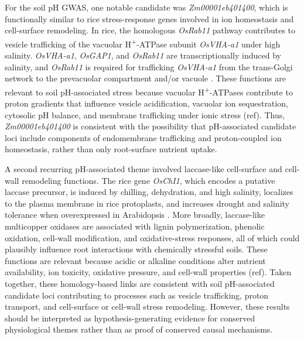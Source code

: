 \documentclass[unnumsec,webpdf,contemporary,large]{oup-authoring-template}%
\theoremstyle{thmstyleone}%
\theoremstyle{thmstyletwo}%
\theoremstyle{thmstylethree}%
\begin{document}
For the soil pH GWAS, one notable candidate was \textit{Zm00001eb401400}, which is functionally similar to rice stress-response genes involved in ion homeostasis and cell-surface remodeling. In rice, the homologous \textit{OsRab11} pathway contributes to vesicle trafficking of the vacuolar H\textsuperscript{+}-ATPase subunit \textit{OsVHA-a1} under high salinity. \textit{OsVHA-a1}, \textit{OsGAP1}, and \textit{OsRab11} are transcriptionally induced by salinity, and \textit{OsRab11} is required for trafficking \textit{OsVHA-a1} from the trans-Golgi network to the prevacuolar compartment and/or vacuole \citep{Son2013OsRab11}. These functions are relevant to soil pH-associated stress because vacuolar H\textsuperscript{+}-ATPases contribute to proton gradients that influence vesicle acidification, vacuolar ion sequestration, cytosolic pH balance, and membrane trafficking under ionic stress (ref). Thus, \textit{Zm00001eb401400} is consistent with the possibility that pH-associated candidate loci include components of endomembrane trafficking and proton-coupled ion homeostasis, rather than only root-surface nutrient uptake.

A second recurring pH-associated theme involved laccase-like cell-surface and cell-wall remodeling functions. The rice gene \textit{OsChI1}, which encodes a putative laccase precursor, is induced by chilling, dehydration, and high salinity, localizes to the plasma membrane in rice protoplasts, and increases drought and salinity tolerance when overexpressed in Arabidopsis \citep{Cho2014OsChI1}. More broadly, laccase-like multicopper oxidases are associated with lignin polymerization, phenolic oxidation, cell-wall modification, and oxidative-stress responses, all of which could plausibly influence root interactions with chemically stressful soils. These functions are relevant because acidic or alkaline conditions alter nutrient availability, ion toxicity, oxidative pressure, and cell-wall properties (ref). Taken together, these homology-based links are consistent with soil pH-associated candidate loci contributing to processes such as vesicle trafficking, proton transport, and cell-surface or cell-wall stress remodeling. However, these results should be interpreted as hypothesis-generating evidence for conserved physiological themes rather than as proof of conserved causal mechanisms.

\end{document}

